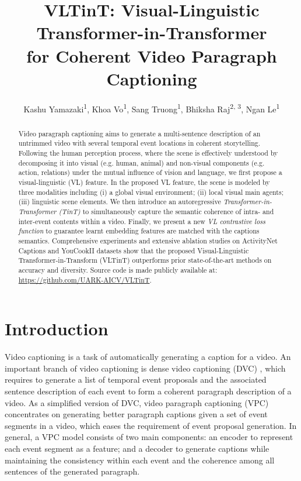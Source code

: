 \documentclass[letterpaper]{article} \usepackage{aaai23}  \usepackage{times}  \usepackage{helvet}  \usepackage{courier}  \usepackage[hyphens]{url}  \usepackage{graphicx} \urlstyle{rm} \def\UrlFont{\rm}  \usepackage{natbib}  \usepackage{caption} \frenchspacing  \setlength{\pdfpagewidth}{8.5in}  \setlength{\pdfpageheight}{11in}  \usepackage{algorithm}
\title{VLTinT: Visual-Linguistic Transformer-in-Transformer \\ for Coherent Video Paragraph Captioning}
\author{Kashu Yamazaki\equalcontrib\textsuperscript{\rm 1}, 
Khoa Vo\equalcontrib\textsuperscript{\rm 1}, 
Sang Truong\textsuperscript{\rm 1}, 
Bhiksha Raj\textsuperscript{\rm 2, \rm 3}, 
Ngan Le\textsuperscript{\rm 1} 
}
\begin{document}
\maketitle

\begin{abstract}
Video paragraph captioning aims to generate a multi-sentence description of an untrimmed video with several temporal event locations in coherent storytelling. 
Following the human perception process, where the scene is effectively understood by decomposing it into visual (e.g. human, animal) and non-visual components (e.g. action, relations) under the mutual influence of vision and language, we first propose a visual-linguistic (VL) feature. In the proposed VL feature, the scene is modeled by three modalities including (i) a global visual environment; (ii) local visual main agents; (iii) linguistic scene elements. We then introduce an autoregressive \emph{Transformer-in-Transformer (TinT)} to simultaneously capture the semantic coherence of intra- and inter-event contents within a video. Finally, we present a new \emph{VL contrastive loss function} to guarantee learnt embedding features are matched with the captions semantics. Comprehensive experiments and extensive ablation studies on ActivityNet Captions and YouCookII datasets show that the proposed Visual-Linguistic Transformer-in-Transform (VLTinT) outperforms prior state-of-the-art methods on accuracy and diversity. Source code is made publicly available at: \url{https://github.com/UARK-AICV/VLTinT}.
\end{abstract}

\section{Introduction}
Video captioning is a task of automatically generating a caption for a video. An important branch of video captioning is dense video captioning (DVC) \cite{krishna2017dense}, which requires to generate a list of temporal event proposals and the associated sentence description of each event to form a coherent paragraph description of a video.
As a simplified version of DVC, video paragraph captioning (VPC) \cite{park2019adversarial} concentrates on generating better paragraph captions given a set of event segments in a video, which eases the requirement of event proposal generation. In general, a VPC model consists of two main components: an encoder to represent each event segment as a feature; and a decoder to generate captions while maintaining the consistency within each event and the coherence among all sentences of the generated paragraph. 
\end{document}
